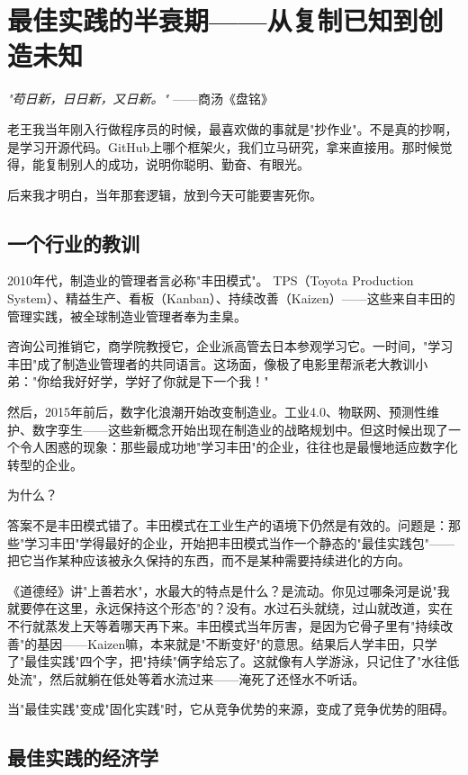\chapter{最佳实践的半衰期——从复制已知到创造未知}


\textit{"苟日新，日日新，又日新。"}
——商汤《盘铭》


老王我当年刚入行做程序员的时候，最喜欢做的事就是"抄作业"。不是真的抄啊，是学习开源代码。GitHub上哪个框架火，我们立马研究，拿来直接用。那时候觉得，能复制别人的成功，说明你聪明、勤奋、有眼光。

后来我才明白，当年那套逻辑，放到今天可能要害死你。

\section{一个行业的教训}


2010年代，制造业的管理者言必称"丰田模式"。 TPS（Toyota Production System）、精益生产、看板（Kanban）、持续改善（Kaizen）——这些来自丰田的管理实践，被全球制造业管理者奉为圭臬。

咨询公司推销它，商学院教授它，企业派高管去日本参观学习它。一时间，"学习丰田"成了制造业管理者的共同语言。这场面，像极了电影里帮派老大教训小弟："你给我好好学，学好了你就是下一个我！"

然后，2015年前后，数字化浪潮开始改变制造业。工业4.0、物联网、预测性维护、数字孪生——这些新概念开始出现在制造业的战略规划中。但这时候出现了一个令人困惑的现象：那些最成功地"学习丰田"的企业，往往也是最慢地适应数字化转型的企业。

为什么？

答案不是丰田模式错了。丰田模式在工业生产的语境下仍然是有效的。问题是：那些"学习丰田"学得最好的企业，开始把丰田模式当作一个静态的"最佳实践包"——把它当作某种应该被永久保持的东西，而不是某种需要持续进化的方向。

《道德经》讲"上善若水"，水最大的特点是什么？是流动。你见过哪条河是说"我就要停在这里，永远保持这个形态"的？没有。水过石头就绕，过山就改道，实在不行就蒸发上天等着哪天再下来。丰田模式当年厉害，是因为它骨子里有"持续改善"的基因——Kaizen嘛，本来就是"不断变好"的意思。结果后人学丰田，只学了"最佳实践"四个字，把"持续"俩字给忘了。这就像有人学游泳，只记住了"水往低处流"，然后就躺在低处等着水流过来——淹死了还怪水不听话。

当"最佳实践"变成"固化实践"时，它从竞争优势的来源，变成了竞争优势的阻碍。

\section{最佳实践的经济学}



